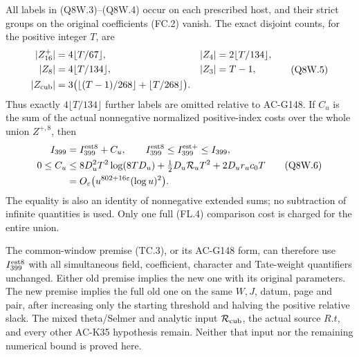 \begin{theorem}
\label{AC-G151-window}
All labels in (Q8W.3)--(Q8W.4) occur on each prescribed host,
and their strict groups on the original coefficients (FC.2) vanish.
The exact disjoint counts, for the positive integer $T$, are
\[
 \begin{aligned}
 |Z_{16}^+|&=4\lfloor T/67\rfloor,&
 |Z_4|&=2\lfloor T/134\rfloor,\\
 |Z_8|&=4\lfloor T/134\rfloor,&
 |Z_3|&=T-1,\\
 |Z_{\rm cub}|&=3\bigl(\lfloor(T-1)/268\rfloor
                                  +\lfloor T/268\rfloor\bigr).
 \end{aligned}
 \tag{Q8W.5}
\]
Thus exactly $4\lfloor T/134\rfloor$ further labels are omitted
relative to AC-G148.
If $C_u$ is the sum of the actual nonnegative normalized
positive-index costs over the whole union $Z^{+,8}$, then
\[
 \begin{aligned}
 I_{399}&=I_{399}^{\rm est8}+C_u,\qquad
       I_{399}^{\rm est8}\leq I_{399}^{\rm est+}\leq I_{399},\\
 0\leq C_u&\leq8D_u^2T^2\log(8TD_u)
                  +\tfrac12D_u\mathcal R_uT^2+2D_ur_uc_0T\\
 &=O_\varepsilon\bigl(u^{802+16\varepsilon}(\log u)^2\bigr).
 \end{aligned}
 \tag{Q8W.6}
\]
The equality is also an identity of nonnegative extended sums;
no subtraction of infinite quantities is used.
Only one full (FL.4) comparison cost is charged for the entire union.

The common-window premise (TC.3), or its AC-G148 form, can therefore
use $I_{399}^{\rm est8}$ with all simultaneous field, coefficient,
character and Tate-weight quantifiers unchanged.
Either old premise implies the new one with its original parameters.
The new premise implies the full old one on the same $W,J$, datum,
page and pair, after increasing only the starting threshold and
halving the positive relative slack.
The mixed theta/Selmer and analytic input $\mathcal R_{\rm cub}$,
the actual source $R.t$, and every other AC-K35 hypothesis remain.
Neither that input nor the remaining numerical bound is proved here.
\end{theorem}

